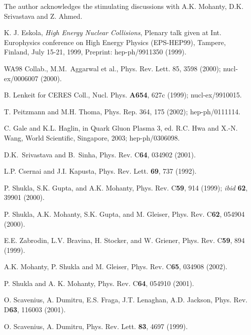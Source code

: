 \acknowledgements
 The author acknowledges the stimulating discussions with A.K.
Mohanty, D.K. Srivastava and Z. Ahmed.


\begin{thebibliography}{00}

 K. J. Eskola, {\it High Energy Nuclear Collisions}, 
  Plenary talk given at Int. Europhysics conference on High Energy Physics 
  (EPS-HEP99), Tampere, Finland, July 15-21, 1999, 
  Preprint: hep-ph/9911350 (1999).
  
 WA98 Collab., M.M.\ Aggarwal et al., 
            Phys. Rev. Lett. 85, 3598 (2000); nucl-ex/0006007 (2000).

 B. Lenkeit for CERES Coll., 
        Nucl. Phys. {\bf A654}, 627c (1999); nucl-ex/9910015.  
  
 T. Peitzmann and M.H. Thoma, Phys. Rep. 364, 175 (2002);
                    hep-ph/0111114.

 C. Gale and K.L. Haglin, in {Quark Gluon Plasma 3},
    ed. R.C. Hwa and X.-N. Wang, World Scientific, Singapore, 2003;
    hep-ph/0306098. 
          
 D.K.\ Srivastava and B.\ Sinha, 
            Phys. Rev. C{\bf 64}, 034902 (2001). 

 L.P. Csernai and J.I. Kapusta, Phys. Rev. Lett. {\bf 69},
               737 (1992).

 P. Shukla, S.K. Gupta, and A.K. Mohanty,
         Phys. Rev. C{\bf 59}, 914 (1999); {\it ibid} {\bf 62}, 39901 (2000).

 P. Shukla, A.K. Mohanty, S.K. Gupta, and M. Gleiser,
              Phys. Rev. C{\bf 62}, 054904 (2000).

 E.E. Zabrodin, L.V. Bravina, H. Stocker, and W. Griener,
         Phys. Rev. C{\bf 59}, 894 (1999).

 A.K. Mohanty, P. Shukla and M. Gleiser,
              Phys. Rev. C{\bf 65}, 034908 (2002).
              
 P. Shukla and A. K. Mohanty, Phys. Rev. C{\bf 64},
        054910 (2001).              

 O. Scavenius, A. Dumitru, E.S. Fraga, J.T. Lenaghan,
         A.D. Jackson, Phys. Rev. D{\bf 63}, 116003 (2001).

 O. Scavenius, A. Dumitru,
         Phys. Rev. Lett. {\bf 83}, 4697 (1999).
         

\end{thebibliography}
